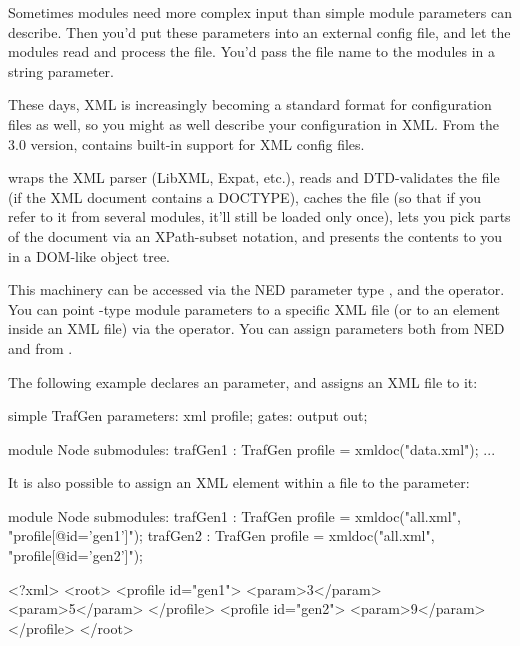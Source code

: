 Sometimes modules need more complex input than simple module parameters
can describe. Then you'd put these parameters into an external config file,
and let the modules read and process the file. You'd pass the file name
to the modules in a string parameter.

These days, XML is increasingly becoming a standard format for configuration
files as well, so you might as well describe your configuration in XML.
From the 3.0 version, {\opp} contains built-in support for XML config files.

{\opp} wraps the XML parser (LibXML, Expat, etc.), reads and DTD-validates
the file (if the XML document contains a DOCTYPE), caches the file
(so that if you refer to it from several modules, it'll still be loaded
only once), lets you pick parts of the document via an XPath-subset notation,
and presents the contents to you in a DOM-like object tree.

This machinery can be accessed via the NED parameter type , and the
 operator. You can point -type module parameters
to a specific XML file (or to an element inside an XML file) via the
 operator. You can assign  parameters both from NED
and from .

The following example declares an  parameter, and assigns an
XML file to it:

\begin{ned}
simple TrafGen {
    parameters:
        xml profile;
    gates:
        output out;
}

module Node {
    submodules:
        trafGen1 : TrafGen {
            profile = xmldoc("data.xml");
        }
        ...
}
\end{ned}

It is also possible to assign an XML element within a file to the parameter:

\begin{ned}
module Node {
    submodules:
        trafGen1 : TrafGen {
            profile = xmldoc("all.xml", "profile[@id='gen1']");
        }
        trafGen2 : TrafGen {
            profile = xmldoc("all.xml", "profile[@id='gen2']");
        }
}
\end{ned}

\begin{filelisting}
<?xml>
<root>
  <profile id="gen1">
    <param>3</param>
    <param>5</param>
  </profile>
  <profile id="gen2">
    <param>9</param>
  </profile>
</root>
\end{filelisting}

